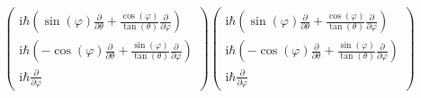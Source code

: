     \begin{align*}
    &\begin{pmatrix}
        \text{i}\hbar \left( \sin(\varphi)\frac{\partial}{\partial\theta} + \frac{\cos(\varphi)}{\tan(\theta)}\frac{\partial}{\partial\varphi}\right)\\
        \text{i}\hbar \left( -\cos(\varphi)\frac{\partial}{\partial\theta} + \frac{\sin(\varphi)}{\tan(\theta)}\frac{\partial}{\partial\varphi}\right)\\
        \text{i}\hbar\frac{\partial}{\partial \varphi}
    \end{pmatrix}
    \begin{pmatrix}
        \text{i}\hbar \left( \sin(\varphi)\frac{\partial}{\partial\theta} + \frac{\cos(\varphi)}{\tan(\theta)}\frac{\partial}{\partial\varphi}\right)\\
        \text{i}\hbar \left( -\cos(\varphi)\frac{\partial}{\partial\theta} + \frac{\sin(\varphi)}{\tan(\theta)}\frac{\partial}{\partial\varphi}\right)\\
        \text{i}\hbar\frac{\partial}{\partial \varphi}
    \end{pmatrix}
    \end{align*}
